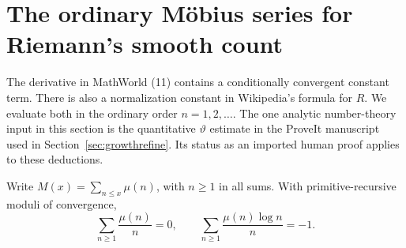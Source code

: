 \section{The ordinary M\"obius series for Riemann's smooth count}
\label{sec:gram}

The derivative in MathWorld (11) contains a conditionally convergent constant term. There is also a normalization constant in Wikipedia's formula for $R$. We evaluate both in the ordinary order $n=1,2,\ldots$. The one analytic number-theory input in this section is the quantitative $\vartheta$ estimate in the ProveIt manuscript used in Section~\ref{sec:growthrefine}. Its status as an imported human proof applies to these deductions.

\begin{lemma}\label{lem:Rboundary}
Write $M(x)=\sum_{n\le x}\mu(n)$, with $n\ge1$ in all sums. With primitive-recursive moduli of convergence,
\[
 \sum_{n\ge1}\frac{\mu(n)}n=0,\qquad
 \sum_{n\ge1}\frac{\mu(n)\log n}{n}=-1 .
\]
\end{lemma}

